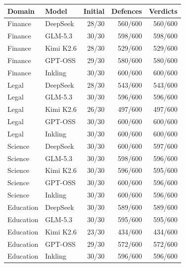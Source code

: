 \begin{tabular}{llrrr}
\toprule
Domain & Model & Initial & Defences & Verdicts \\
\midrule
Finance & DeepSeek & 28/30 & 560/600 & 560/600 \\
Finance & GLM-5.3 & 30/30 & 598/600 & 598/600 \\
Finance & Kimi K2.6 & 28/30 & 529/600 & 529/600 \\
Finance & GPT-OSS & 29/30 & 580/600 & 580/600 \\
Finance & Inkling & 30/30 & 600/600 & 600/600 \\
Legal & DeepSeek & 28/30 & 543/600 & 543/600 \\
Legal & GLM-5.3 & 30/30 & 596/600 & 596/600 \\
Legal & Kimi K2.6 & 26/30 & 497/600 & 497/600 \\
Legal & GPT-OSS & 30/30 & 600/600 & 600/600 \\
Legal & Inkling & 30/30 & 600/600 & 600/600 \\
Science & DeepSeek & 30/30 & 600/600 & 597/600 \\
Science & GLM-5.3 & 30/30 & 598/600 & 596/600 \\
Science & Kimi K2.6 & 30/30 & 596/600 & 595/600 \\
Science & GPT-OSS & 30/30 & 600/600 & 596/600 \\
Science & Inkling & 30/30 & 600/600 & 596/600 \\
Education & DeepSeek & 30/30 & 589/600 & 589/600 \\
Education & GLM-5.3 & 30/30 & 595/600 & 595/600 \\
Education & Kimi K2.6 & 23/30 & 434/600 & 434/600 \\
Education & GPT-OSS & 29/30 & 572/600 & 572/600 \\
Education & Inkling & 30/30 & 596/600 & 596/600 \\
\bottomrule
\end{tabular}
